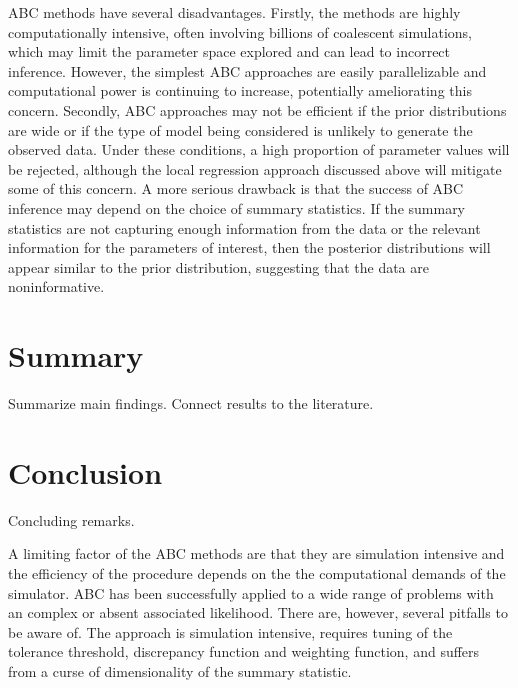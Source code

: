 ABC methods have several disadvantages. Firstly, the methods are highly computationally intensive, often involving billions of coalescent simulations, which may limit the parameter space explored and can lead to incorrect inference. However, the simplest ABC approaches are easily parallelizable and computational power is continuing to increase, potentially ameliorating this concern. Secondly, ABC approaches may not be efficient if the prior distributions are wide or if the type of model being considered is unlikely to generate the observed data. Under these conditions, a high proportion of parameter values will be rejected, although the local regression  approach discussed above will mitigate some of this concern. A more serious drawback is that the success of ABC inference may depend on the choice of summary statistics. If the summary statistics are not capturing enough information from the data or the relevant information for the parameters of interest, then the posterior distributions will appear similar to the prior distribution, suggesting that the data are noninformative. 


\section{Summary}\label{sec:summary}

Summarize main findings. Connect results to the literature. 

\section{Conclusion}\label{sec:conclusion}

Concluding remarks.

A limiting factor of the ABC methods are that they are simulation intensive and the efficiency of the procedure depends on the the computational demands of the simulator.  
ABC has been successfully applied to a wide range of problems with an complex or absent associated likelihood. There are, however, several pitfalls to be aware of. The approach is simulation intensive, requires tuning of the tolerance threshold, discrepancy function and weighting function, and suffers from a curse of dimensionality of the summary statistic.  

